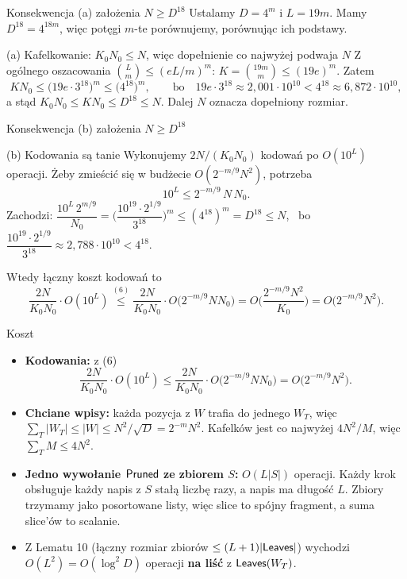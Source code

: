 \begin{frame}{Konsekwencja (a) założenia $N\ge D^{18}$}
  Ustalamy $D=4^m$ i $L=19m$. Mamy $D^{18}=4^{18m}$, więc potęgi $m$-te porównujemy, porównując ich podstawy.
  \pause
  \begin{block}{(a) Kafelkowanie: $K_0N_0\le N$, więc dopełnienie co najwyżej podwaja $N$}
    Z ogólnego oszacowania $\binom Lm\le(eL/m)^m$: $K=\binom{19m}{m}\le(19e)^m$. Zatem
    \[
      KN_0\le\big(19e\cdot3^{18}\big)^m\le\big(4^{18}\big)^m,\qquad\text{bo}\quad
      19e\cdot3^{18}\approx2{,}001\cdot10^{10}<4^{18}\approx6{,}872\cdot10^{10},
    \]
    a stąd $K_0N_0\le KN_0\le D^{18}\le N$. Dalej $N$ oznacza dopełniony rozmiar.
  \end{block}
\end{frame}

\begin{frame}{Konsekwencja (b) założenia $N\ge D^{18}$}
  \begin{block}{(b) Kodowania są tanie}
    Wykonujemy $2N/(K_0N_0)$ kodowań po $O(10^L)$ operacji. Żeby zmieścić się w budżecie $O(2^{-m/9}N^2)$, potrzeba
    \[
      10^L\le2^{-m/9}\,N\,N_0.\tag{6}
    \]
    Zachodzi:
    $\dfrac{10^L\,2^{m/9}}{N_0}=\Big(\dfrac{10^{19}\cdot2^{1/9}}{3^{18}}\Big)^m\le(4^{18})^m=D^{18}\le N$, \
    bo $\dfrac{10^{19}\cdot2^{1/9}}{3^{18}}\approx2{,}788\cdot10^{10}<4^{18}$.
  \end{block}
  \pause
  Wtedy łączny koszt kodowań to
  \[
    \frac{2N}{K_0N_0}\cdot O(10^L)\overset{(6)}{\le}\frac{2N}{K_0N_0}\cdot O\big(2^{-m/9}NN_0\big)=O\Big(\frac{2^{-m/9}N^2}{K_0}\Big)=O\big(2^{-m/9}N^2\big).
  \]
\end{frame}

\begin{frame}{Koszt}
  \begin{itemize}
    \item \textbf{Kodowania:} z (6)
      \[
        \frac{2N}{K_0N_0}\cdot O(10^L)\le\frac{2N}{K_0N_0}\cdot O\big(2^{-m/9}NN_0\big)=O\big(2^{-m/9}N^2\big).
      \]
    \item<2-> \textbf{Chciane wpisy:} każda pozycja z $W$ trafia do jednego $W_T$, więc
      $\sum_T|W_T|\le|W|\le N^2/\sqrt D=2^{-m}N^2$. Kafelków jest co najwyżej $4N^2/M$, więc $\sum_TM\le4N^2$.
    \item<3-> \textbf{Jedno wywołanie $\mathsf{Pruned}$ ze zbiorem $S$:} $O(L|S|)$ operacji. Każdy krok obsługuje każdy napis z $S$ stałą liczbę razy,
      a napis ma długość $L$. Zbiory trzymamy jako posortowane listy, więc slice to spójny fragment, a suma slice'ów to scalanie.
    \item<4-> Z Lematu 10 (łączny rozmiar zbiorów $\le(L+1)|\mathsf{Leaves}|$) wychodzi $O(L^2)=O(\log^2D)$ operacji \textbf{na liść} z $\mathsf{Leaves}(W_T)$.
  \end{itemize}
\end{frame}

